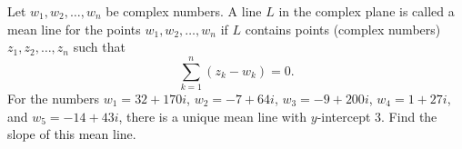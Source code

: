 Let $w_1, w_2, \dots, w_n$ be complex numbers.  A line $L$ in the complex plane is called a mean line for the points $w_1, w_2, \dots, w_n$ if $L$ contains points (complex numbers) $z_1, z_2, \dots, z_n$ such that
\[ \sum_{k = 1}^n (z_k - w_k) = 0. \]
For the numbers $w_1 = 32 + 170i$, $w_2 = -7 + 64i$, $w_3 = -9 +200i$, $w_4 = 1 + 27i$, and $w_5 = -14 + 43i$, there is a unique mean line with $y$-intercept 3.  Find the slope of this mean line.
